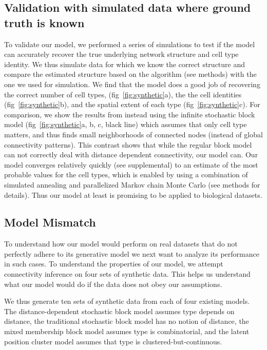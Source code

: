 \documentclass{article}
\begin{document}
\subsection*{Validation with simulated data where ground truth is known}
To validate our model, we performed a series of simulations to test if
the model can accurately recover the true underlying network structure
and cell type identity.  We thus simulate data for which we know the
correct structure and compare the estimated structure based on the
algorithm (see methods) with the one we used for simulation. We find
that the model does a good job of recovering the correct number of
cell types, (fig~\ref{fig:synthetic}a), the the cell identities
(fig~\ref{fig:synthetic}b), and the spatial extent of each type
(fig~\ref{fig:synthetic}c).  For comparison, we show the results from instead using the infinite
stochastic block model (fig~\ref{fig:synthetic}a, b, c, black line) which assumes that only cell type matters, and thus finds
small neighborhoods of connected nodes (instead of global connectivity
patterns). This contrast shows that while the regular block model can not correctly deal with distance dependent connectivity, our model can. Our model converges relatively quickly (see supplemental) to an estimate of
the most probable values for the cell types, which is enabled by using
a combination of simulated annealing and parallelized Markov chain
Monte Carlo (see methods for details). Thus our model at least is promising to be applied to biological datasets.



\subsection*{Model Mismatch}



To understand how our model would perform on real datasets that do not
perfectly adhere to its generative model we next want to analyze its
performance in such cases. To understand the properties of our model, we
attempt connectivity inference on four sets of synthetic data. This helps us understand what our model would do if the data does not obey our assumptions.

We thus generate ten sets of synthetic data from each of four existing models. 
The distance-dependent stochastic block model assumes type depends on distance, 
the traditional stochastic block model has no notion of distance, the mixed membership block model assumes type is combinatorial, and the latent position cluster model assumes that type is clustered-but-continuous. 
\end{document}
